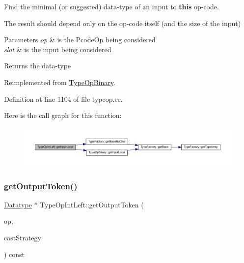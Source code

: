 Find the minimal (or suggested) data-\/type of an input to {\bfseries{this}} op-\/code. 

The result should depend only on the op-\/code itself (and the size of the input) 
\begin{DoxyParams}{Parameters}
{\em op} & is the \mbox{\hyperlink{class_pcode_op}{Pcode\+Op}} being considered \\
\hline
{\em slot} & is the input being considered \\
\hline
\end{DoxyParams}
\begin{DoxyReturn}{Returns}
the data-\/type 
\end{DoxyReturn}


Reimplemented from \mbox{\hyperlink{class_type_op_binary_a6b8460b8ee0e97579321c6d02fe4fd29}{Type\+Op\+Binary}}.



Definition at line 1104 of file typeop.\+cc.

Here is the call graph for this function\+:
\nopagebreak
\begin{figure}[H]
\begin{center}
\leavevmode
\includegraphics[width=350pt]{class_type_op_int_left_ace4697dce938154ffc5098b0c582cf3b_cgraph}
\end{center}
\end{figure}
\mbox{\label{class_type_op_int_left_a0c99823cd347ae28c3608a3f02fdda09}} 
\subsubsection{\texorpdfstring{getOutputToken()}{getOutputToken()}}
{\footnotesize\ttfamily \mbox{\hyperlink{class_datatype}{Datatype}} $\ast$ Type\+Op\+Int\+Left\+::get\+Output\+Token (\begin{DoxyParamCaption}\item[{const \mbox{\hyperlink{class_pcode_op}{Pcode\+Op}} $\ast$}]{op,  }\item[{\mbox{\hyperlink{class_cast_strategy}{Cast\+Strategy}} $\ast$}]{cast\+Strategy }\end{DoxyParamCaption}) const\hspace{0.3cm}{\ttfamily [virtual]}}




